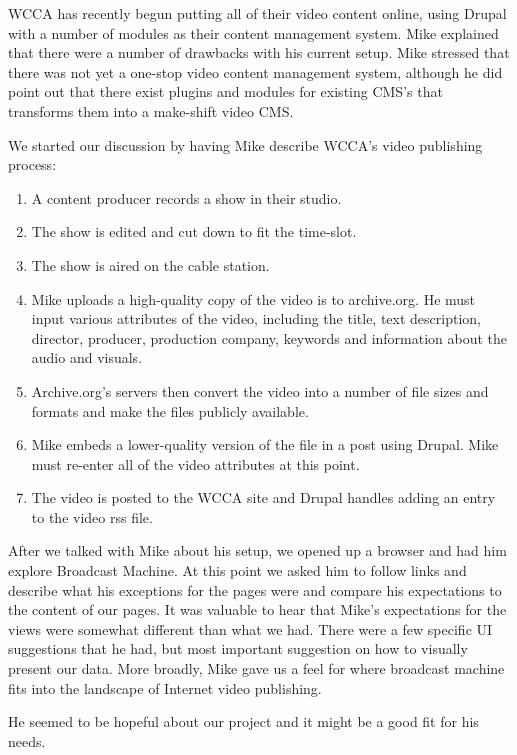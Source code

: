 \documentclass[a4paper,12pt]{report}
\begin{document}
WCCA has recently begun putting all of their video content online, using Drupal with a number of modules as their content management system. 
Mike explained that there were a number of drawbacks with his current setup. 
Mike stressed that there was not yet a one-stop video content management system, although he did point out that there 
exist plugins and modules for existing CMS's that transforms them into a make-shift video CMS. 

We started our discussion by having Mike describe WCCA's video publishing process:

\begin{enumerate}
\item A content producer records a show in their studio. 
\item The show is edited and cut down to fit the time-slot.
\item The show is aired on the cable station. 
\item Mike uploads a high-quality copy of the video is to archive.org. He must input various attributes of the video, including the title, text description, director, producer, production company, keywords and information about the audio and visuals. 
\item Archive.org's servers then convert the video into a number of file sizes and formats and make the files publicly available.
\item Mike embeds a lower-quality version of the file in a post using Drupal. Mike must re-enter all of the video attributes at this point.
\item The video is posted to the WCCA site and Drupal handles adding an entry to the video rss file.
\end{enumerate}

After we talked with Mike about his setup, we opened up a browser and had him explore Broadcast Machine. At this point we 
asked him to follow links and describe what his exceptions for the pages were and compare his expectations to the 
content of our pages. 
It was valuable to hear that Mike's expectations for the views were somewhat different than what we had. 
There were a few specific UI suggestions that he had, but most important suggestion on how to visually present our data.
More broadly, Mike gave us a feel for where broadcast machine fits into the landscape of Internet video publishing. 

He seemed to be hopeful about our project and it might be a good fit for his needs.
\end{document}

